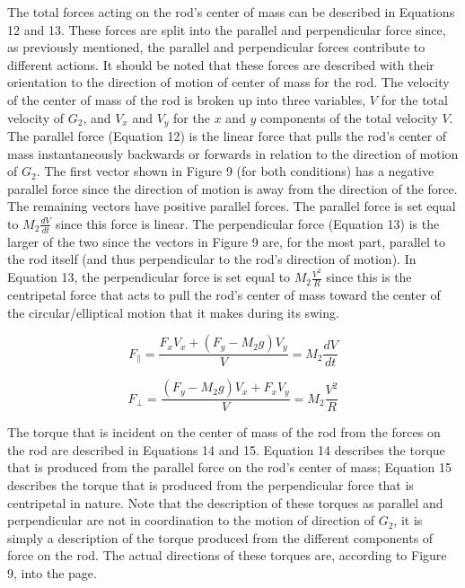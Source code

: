 \documentclass[%
 aip,
 amsmath,amssymb,
 reprint,%
 floatfix,%
]{revtex4-1}
\begin{document}
The total forces acting on the rod's center of mass can be described in Equations 12 and 13. These forces are split into the parallel and perpendicular force since, as previously mentioned, the parallel and perpendicular forces contribute to different actions. It should be noted that these forces are described with their orientation to the direction of motion of center of mass for the rod. The velocity of the center of mass of the rod is broken up into three variables, $V$ for the total velocity of $G_2$, and $V_x$ and $V_y$ for the $x$ and $y$ components of the total velocity $V$. The parallel force (Equation 12) is the linear force that pulls the rod's center of mass instantaneously backwards or forwards in relation to the direction of motion of $G_2$. The first vector shown in Figure 9 (for both conditions) has a negative parallel force since the direction of motion is away from the direction of the force. The remaining vectors have positive parallel forces. The parallel force is set equal to $M_2 \frac{dV}{dt}$ since this force is linear. The perpendicular force (Equation 13) is the larger of the two since the vectors in Figure 9 are, for the most part, parallel to the rod itself (and thus perpendicular to the rod's direction of motion). In Equation 13, the perpendicular force is set equal to $M_2 \frac{V^2}{R}$ since this is the centripetal force that acts to pull the rod's center of mass toward the center of the circular/elliptical motion that it makes during its swing.

\begin{equation}
	F_{\parallel}=\frac{F_x V_x + (F_y - M_2 g) V_y}{V} = M_2 \frac{dV}{dt}
\end{equation}

\begin{equation}
	F_{\perp}=\frac{(F_y - M_2 g)V_x+ F_x V_y}{V} = M_2 \frac{V^2}{R}
\end{equation}

The torque that is incident on the center of mass of the rod from the forces on the rod are described in Equations 14 and 15. Equation 14 describes the torque that is produced from the parallel force on the rod's center of mass; Equation 15 describes the torque that is produced from the perpendicular force that is centripetal in nature. Note that the description of these torques as parallel and perpendicular are not in coordination to the motion of direction of $G_2$, it is simply a description of the torque produced from the different components of force on the rod. The actual directions of these torques are, according to Figure 9, into the page.
\end{document}
